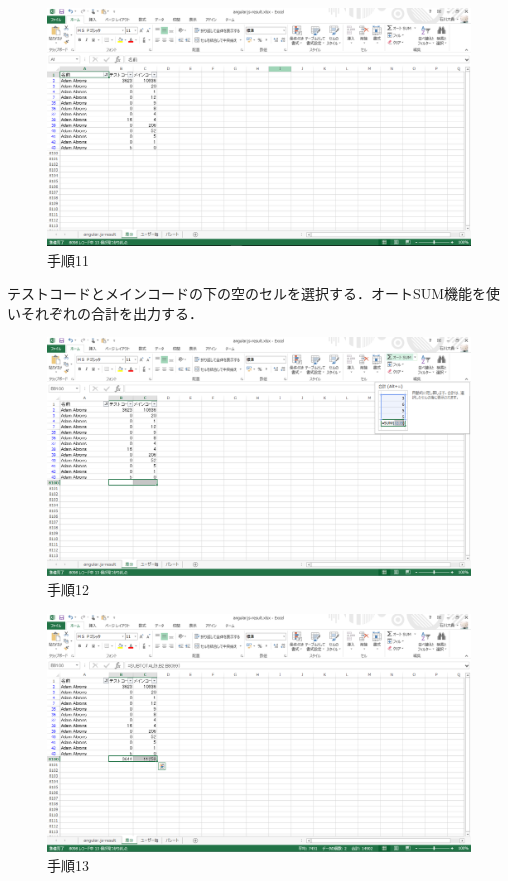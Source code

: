 \begin{figure}[h]
\centering
\includegraphics[width=13cm]{process11.png}
\caption{手順11}
\end{figure}

\newpage

テストコードとメインコードの下の空のセルを選択する．オートSUM機能を使いそれぞれの合計を出力する．

\begin{figure}[h]
\centering
\includegraphics[width=13cm]{process12.png}
\caption{手順12}
\end{figure}

\begin{figure}[h]
\centering
\includegraphics[width=13cm]{process13.png}
\caption{手順13}
\end{figure}

